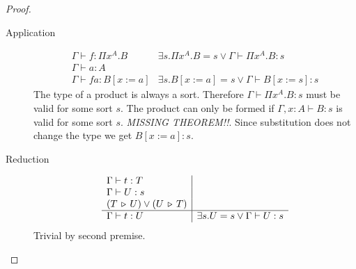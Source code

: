 \documentclass[12pt]{article}
\begin{document}
\begin{theorem}
\begin{proof}
\begin{description}
    \item[Application]
      $$
      \begin{array}{l|l}
        \Gamma\vdash f:\Pi x^A.B & \exists s. \Pi x^A.B = s \lor
                                   \Gamma\vdash \Pi x^A.B: s
        \\
        \Gamma\vdash a:A
        \\
        \hline
        \Gamma\vdash f a:B[x:=a] & \exists s. B[x:=a] = s \lor
                                   \Gamma\vdash B[x:=s]: s
      \end{array}
      $$
      The type of a product is always a sort. Therefore
      $\Gamma\vdash \Pi x^A.B : s $ must be valid for some sort $s$. The
      product can only be formed if $\Gamma,x:A \vdash B:s$ is valid for some
      sort $s$. \emph{MISSING THEOREM!!}. Since substitution does not change
      the type we get $B[x:=a]: s$.
    \item[Reduction]
      $$
      \begin{array}{l|l}
        \Gamma\vdash t:T \\
        \Gamma\vdash U: s \\
        (T \,\triangleright\, U) \lor (U \,\triangleright\, T) \\
        \hline
        \Gamma\vdash t:U & \exists s. U = s \lor \Gamma\vdash U:s
      \end{array}
      $$
      Trivial by second premise.
    \end{description}
  \end{proof}
\end{theorem}
\end{document}
